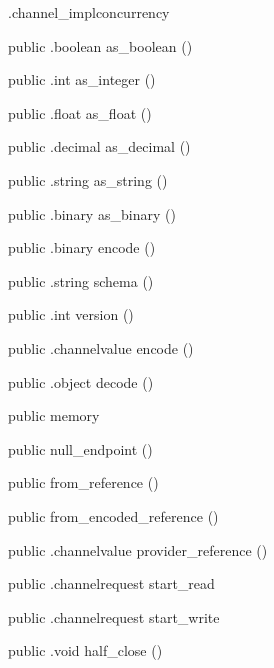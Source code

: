 \begin{CrexxClass}{.channel\_impl}{concurrency}
\begin{Members}
    \Method
      {public}
      {.boolean}
      {as\_boolean}
      {()}

    \Method
      {public}
      {.int}
      {as\_integer}
      {()}

    \Method
      {public}
      {.float}
      {as\_float}
      {()}

    \Method
      {public}
      {.decimal}
      {as\_decimal}
      {()}

    \Method
      {public}
      {.string}
      {as\_string}
      {()}

    \Method
      {public}
      {.binary}
      {as\_binary}
      {()}

    \Method
      {public}
      {.binary}
      {encode}
      {()}

    \Method
      {public}
      {.string}
      {schema}
      {()}

    \Method
      {public}
      {.int}
      {version}
      {()}

    \Method
      {public}
      {.channelvalue}
      {encode}
      {()}

    \Method
      {public}
      {.object}
      {decode}
      {()}

    \Factory
      {public}
      {memory}
      {}

    \Factory
      {public}
      {null\_endpoint}
      {()}

    \Factory
      {public}
      {from\_reference}
      {()}

    \Factory
      {public}
      {from\_encoded\_reference}
      {()}

    \Method
      {public}
      {.channelvalue}
      {provider\_reference}
      {()}

    \Method
      {public}
      {.channelrequest}
      {start\_read}
      {}

    \Method
      {public}
      {.channelrequest}
      {start\_write}
      {}

    \Method
      {public}
      {.void}
      {half\_close}
      {()}


\end{Members}
\end{CrexxClass}

